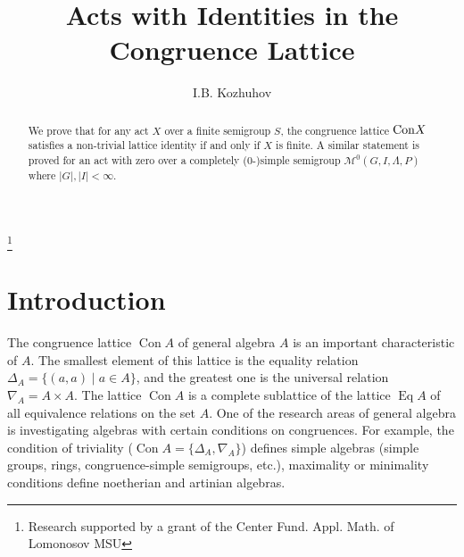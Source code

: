 \documentclass{birkau}
\numberwithin{equation}{section}
\theoremstyle{plain}
\theoremstyle{definition}
\DeclareMathOperator{\Con}{Con}
\DeclareMathOperator{\Eq}{Eq}
\begin{document}
	
    \title[Acts with Identities in the Congruence Lattice]{Acts with Identities in the Congruence Lattice}

    \author[I.B. Kozhuhov]{I.B. Kozhuhov}
    \address{National Research University MIET, \\
    Faculty of Mechanics and Mathematics of Lomonosov Moscow State University, \\
    Center of Fundamental and Applied Mathematics of Lomonosov MSU \\
    Moscow\\Russia}

    \address{National Research University MIET\\Moscow\\Russia}
    
    \thanks{Research supported by a grant of the Center Fund. Appl. Math. of Lomonosov MSU}
	

    \begin{abstract}
    We prove that for any act $X$ over a finite semigroup $S$, the congruence lattice  ${\rm Con}X$ satisfies a non-trivial lattice identity if and only if $X$ is finite. A similar statement is proved for an act with zero over a completely (0-)simple semigroup $\mathcal M^0(G,I,\Lambda,P)$ where $|G|,|I| <\infty$.
    \end{abstract}
	
	\maketitle
	
	\section{Introduction}
	
	The congruence lattice $\Con A$ of general algebra $ A $ is an important characteristic of $A$. The smallest element of this lattice is the equality relation $ \Delta_A = \{ (a,a) \mid a \in A \} $, and the greatest one is the universal relation $ \nabla_A = A \times A $. The lattice $\Con A$ is a complete sublattice of the lattice $\Eq A$ of all equivalence relations on the set $A$.
    One of the research areas of general algebra is investigating algebras with certain conditions on congruences.	For example, the condition of triviality ($ \Con A = \{ \Delta_A, \nabla_A \} $) defines simple algebras (simple groups, rings, congruence-simple semigroups, etc.), maximality or minimality conditions define noetherian and artinian algebras.
	
\end{document}
